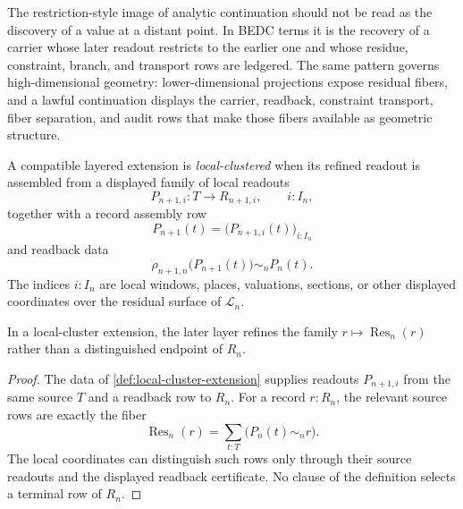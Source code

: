\begin{principle}
\label{prin:continuation-recovers-carriers-not-remote-values}
The restriction-style image of analytic continuation should not be read as
the discovery of a value at a distant point. In BEDC terms it is the
recovery of a carrier whose later readout restricts to the earlier one and
whose residue, constraint, branch, and transport rows are ledgered. The
same pattern governs high-dimensional geometry: lower-dimensional
projections expose residual fibers, and a lawful continuation displays the
carrier, readback, constraint transport, fiber separation, and audit rows
that make those fibers available as geometric structure.
\end{principle}

\begin{definition}
\label{def:local-cluster-extension}
A compatible layered extension is \emph{local-clustered} when its refined
readout is assembled from a displayed family of local readouts
$$
P_{n+1,i}:T\to R_{n+1,i},
\qquad
i:I_n,
$$
together with a record assembly row
$$
P_{n+1}(t)=\bigl(P_{n+1,i}(t)\bigr)_{i:I_n}
$$
and readback data
$$
\rho_{n+1,n}\bigl(P_{n+1}(t)\bigr)\sim_n P_n(t).
$$
The indices $i:I_n$ are local windows, places, valuations, sections, or
other displayed coordinates over the residual surface of $\mathcal L_n$.
\end{definition}

\begin{theorem}
\label{thm:local-clusters-refine-fibers}
In a local-cluster extension, the later layer refines the family
$r\mapsto\operatorname{Res}_n(r)$ rather than a distinguished endpoint of
$R_n$.
\end{theorem}

\begin{proof}
The data of \autoref{def:local-cluster-extension} supplies readouts
$P_{n+1,i}$ from the same source $T$ and a readback row to $R_n$. For a
record $r:R_n$, the relevant source rows are exactly the fiber
$$
\operatorname{Res}_n(r)
=
\sum_{t:T}\bigl(P_n(t)\sim_n r\bigr).
$$
The local coordinates can distinguish such rows only through their
source readouts and the displayed readback certificate. No clause of the
definition selects a terminal row of $R_n$.
\end{proof}

